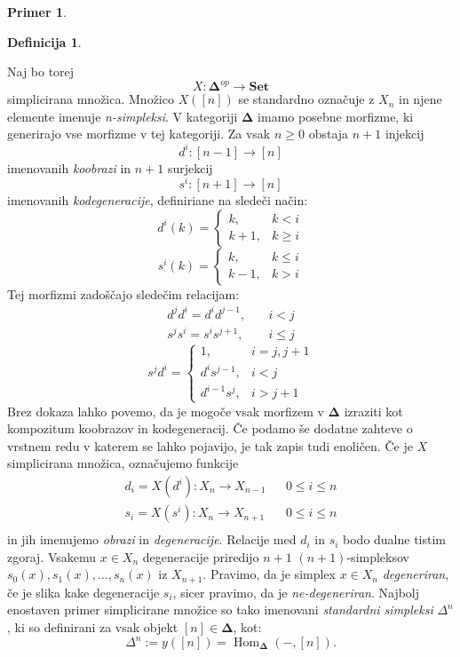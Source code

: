 \documentclass[12pt,a4paper]{book}
\theoremstyle{definition}
\newtheorem{definicija}{Definicija}[chapter]
\theoremstyle{plain}
\theoremstyle{definition}
\newtheorem{primer}{Primer}[section]
\theoremstyle{remark}
\newcommand{\cat}[1]{\textbf{#1}}
\DeclareMathOperator{\Hom}{Hom}
\begin{document}
\begin{primer}
\begin{definicija}
\end{definicija}
Naj bo torej
$$X : \mathbf{\Delta}^{op} \to \cat{Set}$$
simplicirana množica. Množico $X([n])$ se standardno označuje z $X_n$ in njene elemente imenuje \emph{n-simpleksi}. 
V kategoriji $\mathbf{\Delta}$ imamo posebne morfizme, ki generirajo vse morfizme v tej kategoriji. Za vsak $n \geq 0$ obstaja $n+1$ injekcij 
$$d^i : [n-1] \to [n]$$ 
imenovanih \emph{koobrazi} in $n+1$ surjekcij 
$$s^i : [n+1] \to [n]$$
imenovanih \emph{kodegeneracije}, definiriane na sledeči način:
%
$$d^i(k) = \begin{cases}
k, & k < i \\
k+1, & k \geq i 
\end{cases} $$
$$s^i(k) = \begin{cases}
k, & k \leq i \\
k-1, & k > i
\end{cases} $$
Tej morfizmi zadoščajo sledečim relacijam:
\begin{align*}
d^j d^i = d^i d^{j-1}, & \quad i < j \\
s^j s^i = s^i s^{j+1}, & \quad i \leq j 
\end{align*}
$$ s^j d^i = \begin{cases}
1, & i = j, j+1 \\
d^i s^{j-1}, & i < j \\
d^{i-1} s^j, & i > j+1
\end{cases} $$
%
Brez dokaza lahko povemo, da je mogoče vsak morfizem v $\mathbf{\Delta}$ izraziti kot kompozitum koobrazov in kodegeneracij. Če podamo še dodatne zahteve o vrstnem redu v katerem se lahko pojavijo, je tak zapis tudi enoličen.
%
Če je $X$ simplicirana množica, označujemo funkcije
\begin{align*}
d_i = X(d^i) : X_n \to X_{n-1} & & 0 \leq i \leq n \\
s_i = X(s^i) : X_n \to X_{n+1} & & 0 \leq i \leq n \\
\end{align*}
in jih imenujemo \emph{obrazi} in \emph{degeneracije}. Relacije med $d_i$ in $s_i$ bodo dualne tistim zgoraj.
Vsakemu $x \in X_n$ degeneracije priredijo $n+1$ $(n+1)$-simpleksov $s_0(x), s_1(x), \ldots , s_n(x)$ iz  $X_{n+1}$. Pravimo, da je simplex $x \in X_n$ \emph{degeneriran}, če je slika kake degeneracije $s_i$, sicer pravimo, da je \emph{ne-degeneriran}.
%
Najbolj enostaven primer simplicirane množice so tako imenovani \emph{standardni simpleksi} $\Delta^n$, ki so definirani za vsak objekt $[n] \in \mathbf{\Delta}$, kot:
$$\Delta^n := y([n]) = \Hom_{\mathbf{\Delta}}(-,[n]).$$

\end{primer}
\end{document}

